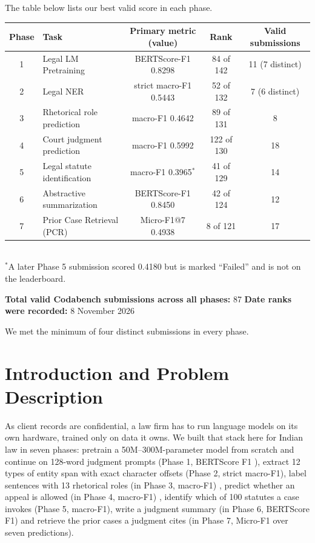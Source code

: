 \documentclass[11pt, oneside]{article}
\begin{document}
\noindent
The table below lists our best valid score in each phase.
\begin{table}[H]
\centering\small
\begin{tabular}{clccc}
\toprule
Phase & Task & Primary metric (value) & Rank & Valid submissions \\
\midrule
1 & Legal LM Pretraining & BERTScore-F1 0.8298 & 84 of 142 & 11 (7 distinct) \\
2 & Legal NER & strict macro-F1 0.5443 & 52 of 132 & 7 (6 distinct) \\
3 & Rhetorical role prediction & macro-F1 0.4642 & 89 of 131 & 8 \\
4 & Court judgment prediction & macro-F1 0.5992 & 122 of 130 & 18 \\
5 & Legal statute identification & macro-F1 0.3965$^\ast$ & 41 of 129 & 14 \\
6 & Abstractive summarization & BERTScore-F1 0.8450 & 42 of 124 & 12 \\
7 & Prior Case Retrieval (PCR) & Micro-F1@7 0.4938 & 8 of 121 & 17 \\
\bottomrule
\end{tabular}
\\[2pt]{\footnotesize $^\ast$A later Phase 5 submission scored 0.4180 but is marked ``Failed'' and is not on the leaderboard.}
\end{table}
\noindent
\textbf{Total valid Codabench submissions across all phases:} 87
\quad
\textbf{Date ranks were recorded:} 8 November 2026
\medskip

\noindent We met the minimum of four distinct submissions in every phase.
\section{Introduction and Problem Description}
As client records are confidential, a law firm has to run language models on its own hardware, trained only on data it owns. We built that stack here for Indian law in seven phases: pretrain a 50M--300M-parameter model from scratch and continue on 128-word judgment prompts (Phase 1, BERTScore F1 \cite{zhang2020bertscore}), extract 12 types of entity span with exact character offsets (Phase 2, strict macro-F1), label sentences with 13 rhetorical roles (in Phase 3, macro-F1) \cite{kalamkar2022corpus}, predict whether an appeal is allowed (in Phase 4, macro-F1) \cite{malik2021ildc}, identify which of 100 statutes a case invokes (Phase 5, macro-F1), write a judgment summary (in Phase 6, BERTScore F1) and retrieve the prior cases a judgment cites (in Phase 7, Micro-F1 over seven predictions).
\end{document}
